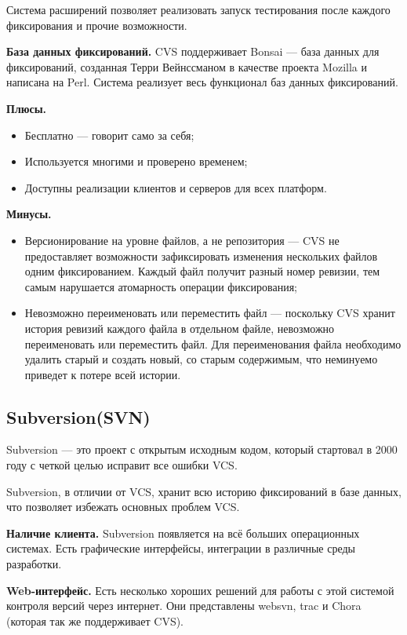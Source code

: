 Система расширений позволяет реализовать запуск тестирования после каждого фиксирования и прочие возможности.

\textbf{База данных фиксирований.} CVS поддерживает Bonsai --- база данных для фиксирований, созданная Терри Вейнссманом в качестве проекта Mozilla и написана на Perl. Система реализует весь функционал баз данных фиксирований.

\textbf{Плюсы.}
\begin{itemize}
\item Бесплатно --- говорит само за себя;
\item Используется многими и проверено временем;
\item Доступны реализации клиентов и серверов для всех платформ.
\end{itemize}

\textbf{Минусы.}
\begin{itemize}
\item Версионирование на уровне файлов, а не репозитория --- CVS не предоставляет возможности зафиксировать изменения нескольких файлов одним фиксированием. Каждый файл получит разный номер ревизии, тем самым нарушается атомарность операции фиксирования;
\item Невозможно переименовать или переместить файл --- поскольку CVS хранит история ревизий каждого файла в отдельном файле, невозможно переименовать или переместить файл. Для переименования файла необходимо удалить старый и создать новый, со старым содержимым, что неминуемо приведет к потере всей истории.
\end{itemize}


\subsection{ Subversion(SVN) } \label{sect3_4_3}

Subversion --- это проект с открытым исходным кодом, который стартовал в 2000 году с четкой целью исправит все ошибки VCS. 

Subversion, в отличии от VCS, хранит всю историю фиксирований в базе данных, что позволяет избежать основных проблем VCS.

\textbf{Наличие клиента.} Subversion появляется на всё больших операционных системах. Есть графические интерфейсы, интеграции в различные среды разработки.

\textbf{Web-интерфейс.} Есть несколько хороших решений для  работы с этой системой контроля версий через интернет. Они представлены websvn, trac и Chora (которая так же поддерживает CVS).

